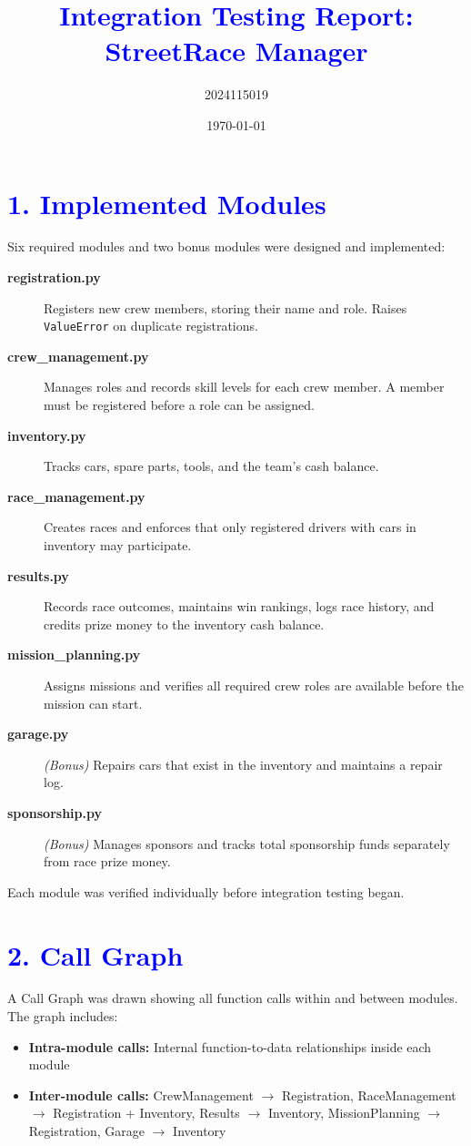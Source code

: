 \documentclass{article}
\title{\textcolor{blue}{Integration Testing Report: StreetRace Manager}}
\author{2024115019}
\date{\today}
\begin{document}
\maketitle

\section*{\textcolor{blue}{1. Implemented Modules}}

Six required modules and two bonus modules were designed and implemented:

\begin{description}
  \item[\textbf{registration.py}] Registers new crew members, storing their name and role. Raises \texttt{ValueError} on duplicate registrations.
  \item[\textbf{crew\_management.py}] Manages roles and records skill levels for each crew member. A member must be registered before a role can be assigned.
  \item[\textbf{inventory.py}] Tracks cars, spare parts, tools, and the team's cash balance.
  \item[\textbf{race\_management.py}] Creates races and enforces that only registered drivers with cars in inventory may participate.
  \item[\textbf{results.py}] Records race outcomes, maintains win rankings, logs race history, and credits prize money to the inventory cash balance.
  \item[\textbf{mission\_planning.py}] Assigns missions and verifies all required crew roles are available before the mission can start.
  \item[\textbf{garage.py}] \textit{(Bonus)} Repairs cars that exist in the inventory and maintains a repair log.
  \item[\textbf{sponsorship.py}] \textit{(Bonus)} Manages sponsors and tracks total sponsorship funds separately from race prize money.
\end{description}

Each module was verified individually before integration testing began.

\section*{\textcolor{blue}{2. Call Graph}}

A Call Graph was drawn showing all function calls within and between modules. The graph includes:
\begin{itemize}[noitemsep]
  \item \textbf{Intra-module calls:} Internal function-to-data relationships inside each module
  \item \textbf{Inter-module calls:} CrewManagement $\to$ Registration, RaceManagement $\to$ Registration + Inventory, Results $\to$ Inventory, MissionPlanning $\to$ Registration, Garage $\to$ Inventory
\end{itemize}
\end{document}
